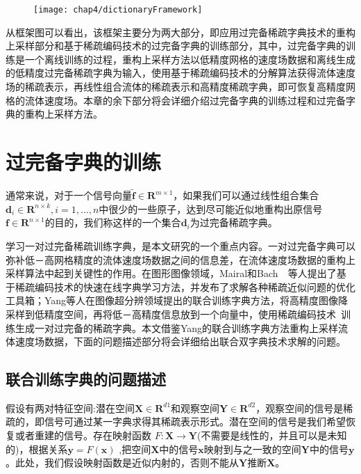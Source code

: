 \begin{figure}
  \centering
   \texttt{[image: chap4/dictionaryFramework]}
\end{figure}

从框架图可以看出，该框架主要分为两大部分，即应用过完备稀疏字典技术的重构上采样部分和基于稀疏编码技术的过完备字典的训练部分，其中，过完备字典的训练是一个离线训练的过程，重构上采样方法以低精度网格的速度场数据和离线生成的低精度过完备稀疏字典为输入，使用基于稀疏编码技术的分解算法获得流体速度场的稀疏表示，再线性组合流体的稀疏表示和高精度稀疏字典，即可恢复高精度网格的流体速度场。本章的余下部分将会详细介绍过完备字典的训练过程和过完备字典的重构上采样方法。

\section{过完备字典的训练}
\label{sub:dics}

通常来说，对于一个信号向量\({ \boldsymbol {\tilde f}} \in {\boldsymbol R}^{m \times 1}\)，如果我们可以通过线性组合集合\(\boldsymbol d_i \in {\boldsymbol R}^{n \times k},i=1,…,n\)中很少的一些原子，达到尽可能近似地重构出原信号\({\boldsymbol f}  \in {\boldsymbol R}^{n \times 1}\)的目的，我们称这样的一个集合\(\boldsymbol d_i\)为过完备稀疏字典。

学习一对过完备稀疏训练字典，是本文研究的一个重点内容。一对过完备字典可以弥补低－高网格精度的流体速度场数据之间的信息差，在流体速度场数据的重构上采样算法中起到关键性的作用。在图形图像领域，Mairal和Bach~\cite{mairal2009online}~\cite{mairal2010online}等人提出了基于稀疏编码技术的快速在线字典学习方法，并发布了求解各种稀疏近似问题的优化工具箱；Yang等人在图像超分辨领域提出的联合训练字典方法，将高精度图像降采样到低精度空间，再将低－高精度信息放到一个向量中，使用稀疏编码技术~\cite{lee2006efficient}训练生成一对过完备的稀疏字典。本文借鉴Yang的联合训练字典方法重构上采样流体速度场数据，下面的问题描述部分将会详细给出联合双字典技术求解的问题。

\subsection{联合训练字典的问题描述}
\label{chap:problem}

假设有两对特征空间:潜在空间$\boldsymbol X \in \boldsymbol R^{d1} $和观察空间$\boldsymbol Y \in \boldsymbol R^{d2} $，观察空间的信号是稀疏的，即信号可通过某一字典求得其稀疏表示形式。潜在空间的信号是我们希望恢复或者重建的信号。存在映射函数 $F:\boldsymbol X \rightarrow \boldsymbol Y$(不需要是线性的，并且可以是未知的)，根据关系$\boldsymbol y = F(\boldsymbol x)$ ,把空间$\boldsymbol X$中的信号$\boldsymbol x$映射到与之一致的空间$\boldsymbol Y$中的信号$\boldsymbol y$。此处，我们假设映射函数是近似内射的，否则不能从$\boldsymbol Y$推断$\boldsymbol X$。

